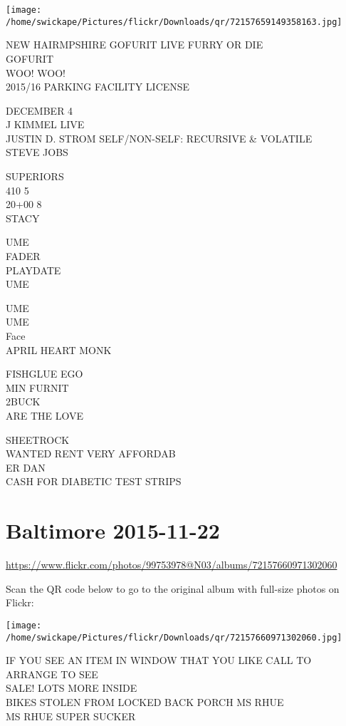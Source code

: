 \documentclass[10pt,letterpaper]{article}
\begin{document}
\texttt{[image: /home/swickape/Pictures/flickr/Downloads/qr/72157659149358163.jpg]}


NEW HAIRMPSHIRE GOFURIT LIVE FURRY OR DIE\\
GOFURIT\\
WOO!  WOO!\\
2015/16 PARKING FACILITY LICENSE

DECEMBER 4\\
J KIMMEL LIVE\\
JUSTIN D. STROM SELF/NON{-}SELF: RECURSIVE \& VOLATILE\\
STEVE JOBS

SUPERIORS\\
410 5\\
20+00 8\\
STACY

UME\\
FADER\\
PLAYDATE\\
UME

UME\\
UME\\
Face\\
APRIL HEART MONK

FISHGLUE EGO\\
MIN FURNIT\\
2BUCK\\
ARE THE LOVE

SHEETROCK\\
WANTED RENT VERY AFFORDAB\\
ER DAN\\
CASH FOR DIABETIC TEST STRIPS


\section*{Baltimore 2015-11-22}

\url{https://www.flickr.com/photos/99753978@N03/albums/72157660971302060}

Scan the QR code below to go to the original album with full-size photos on Flickr:

\texttt{[image: /home/swickape/Pictures/flickr/Downloads/qr/72157660971302060.jpg]}


IF YOU SEE AN ITEM IN WINDOW THAT YOU LIKE CALL TO ARRANGE TO SEE\\
SALE!  LOTS MORE INSIDE\\
BIKES STOLEN FROM LOCKED BACK PORCH MS RHUE\\
MS RHUE SUPER SUCKER
\end{document}
